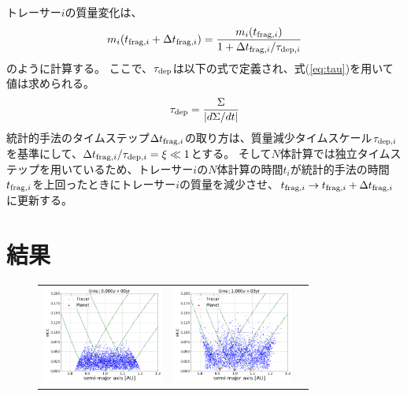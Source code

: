 \documentclass[a4paper,10pt,oneside,twocolumn,notitlepage,final]{jarticle}
\begin{document}
トレーサー$i$の質量変化は、
\begin{align}
 m_i(t_{{\rm frag},i} + \Delta t_{{\rm frag},i}) = \frac{m_i(t_{{\rm frag},i})}{1 + \Delta t_{{\rm frag},i}/\tau_{{\rm dep},i}}
\end{align}
のように計算する。
ここで、$\tau_{\rm dep}$は以下の式で定義され、式(\ref{eq:tau})を用いて値は求められる。
\begin{align}
 \tau_{\rm dep} = \frac{\Sigma}{|d \Sigma/ dt|}
\end{align}
統計的手法のタイムステップ$\Delta t_{{\rm frag},i}$の取り方は、質量減少タイムスケール$\tau_{{\rm dep},i}$を基準にして、$\Delta t_{{\rm frag},i}/\tau_{{\rm dep},i} = \xi \ll 1$とする。
そして$N$体計算では独立タイムステップを用いているため、トレーサー$i$の$N$体計算の時間$t_i$が統計的手法の時間$t_{{\rm frag},i}$を上回ったときにトレーサー$i$の質量を減少させ、$t_{{\rm frag},i} \to t_{{\rm frag},i} + \Delta t_{{\rm frag},i}$に更新する。

\section{結果}


\begin{figure}[h]
\begin{tabular}{ccc}
\begin{minipage}[t]{0.5\hsize}
\centering
\includegraphics[width=4cm]{./image/axis_ecc_T00_rand08.png}
\end{minipage} &
\begin{minipage}[t]{0.5\hsize}
\centering
\includegraphics[width=4cm]{./image/axis_ecc_T33_rand08.png}
\end{minipage}\\
%
\end{tabular}
\caption{\label{fig:axis_ecc3}}
\end{figure}
\end{document}
